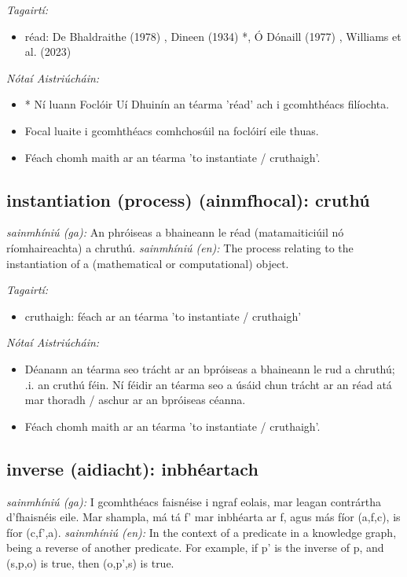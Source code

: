 \documentclass{article}
\begin{document}
 \noindent \textit{Tagairtí:}
\begin{itemize}
	\item réad: De Bhaldraithe (1978) \cite{de-bhaldraithe}, Dineen (1934) \cite{dineen}*, Ó Dónaill (1977) \cite{odonaill}, Williams et al. (2023) \cite{storchiste}
\end{itemize}

 \noindent \textit{Nótaí Aistriúcháin:}
\begin{itemize}
	\item * Ní luann Foclóir Uí Dhuinín an téarma 'réad' ach i gcomhthéacs filíochta.
	\item Focal luaite i gcomhthéacs comhchosúil na foclóirí eile thuas.
	\item Féach chomh maith ar an téarma 'to instantiate / cruthaigh'.
\end{itemize}


\subsection*{instantiation (process) (ainmfhocal): cruthú} 
 \noindent \textit{sainmhíniú (ga):} An phróiseas a bhaineann le réad (matamaiticiúil nó ríomhaireachta) a chruthú.
\newline\newline
 \noindent \textit{sainmhíniú (en):} The process relating to the instantiation of a (mathematical or computational) object.
\newline

 \noindent \textit{Tagairtí:}
\begin{itemize}
	\item cruthaigh: féach ar an téarma 'to instantiate / cruthaigh'
\end{itemize}

 \noindent \textit{Nótaí Aistriúcháin:}
\begin{itemize}
	\item Déanann an téarma seo trácht ar an bpróiseas a bhaineann le rud a chruthú; .i. an cruthú féin. Ní féidir an téarma seo a úsáid chun trácht ar an réad atá mar thoradh / aschur ar an bpróiseas céanna.
	\item Féach chomh maith ar an téarma 'to instantiate / cruthaigh'.
\end{itemize}


\subsection*{inverse (aidiacht): inbhéartach} 
 \noindent \textit{sainmhíniú (ga):} I gcomhthéacs faisnéise i ngraf eolais, mar leagan contrártha d'fhaisnéis eile. Mar shampla, má tá f' mar inbhéarta ar f, agus más fíor (a,f,c), is fíor (c,f',a).
\newline\newline
 \noindent \textit{sainmhíniú (en):} In the context of a predicate in a knowledge graph, being a reverse of another predicate. For example, if p' is the inverse of p, and (s,p,o) is true, then (o,p',s) is true.
\newline
\end{document}
